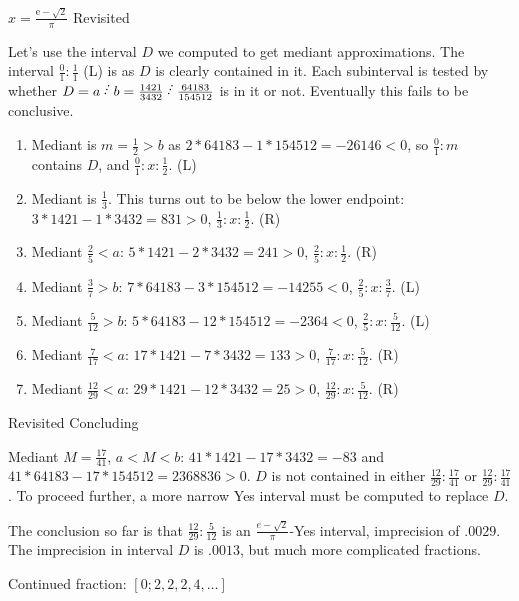 \documentclass{beamer}
\begin{document}
\begin{frame}{$x = \frac{\mathrm{e} -\sqrt{2}}{\pi}$ Revisited}

Let's use the interval $D$ we computed to get mediant approximations. The interval $\frac{0}{1}:\frac{1}{1}$ (L) is as $D$ is clearly contained in it. Each subinterval is tested by whether $D= a\lte b =  \frac{1421}{3432} \lte \frac{64183}{154512}$ is in it or not. Eventually this fails to be conclusive. 

\begin{enumerate}
\item Mediant is $m = \frac{1}{2} > b$ as $2*64183 - 1*154512 = -26146 < 0$,  so $\frac{0}{1}:m$ contains $D$, and $\frac{0}{1}: x :\frac{1}{2}$. (L)
\item Mediant is $\frac{1}{3}$. This turns out to be below the lower endpoint:  $3*1421 - 1*3432 = 831>0$,   $\frac{1}{3}: x : \frac{1}{2}$. (R)
\item Mediant $\frac{2}{5} < a$: $5*1421 - 2*3432 = 241 > 0$, $\frac{2}{5}: x:\frac{1}{2}$. (R)
\item Mediant $\frac{3}{7} > b$: $7*64183- 3*154512 = -14255 < 0$, $\frac{2}{5}: x :\frac{3}{7}$. (L)
\item Mediant  $\frac{5}{12} > b$: $5*64183 - 12*154512 = -2364 < 0$, $\frac{2}{5}: x : \frac{5}{12}$. (L)
\item Mediant $\frac{7}{17}< a$: $17*1421 - 7*3432 = 133 > 0$, $\frac{7}{17}: x : \frac{5}{12}$. (R)
\item Mediant $\frac{12}{29}<a$: $29*1421 - 12*3432 = 25 > 0$, $\frac{12}{29}: x : \frac{5}{12}$. (R)

\end{enumerate}

\end{frame}

\begin{frame}{Revisited Concluding}
    
Mediant $M = \frac{17}{41}$, $a < M < b$: $41*1421-17*3432 = -83$ and $41*64183-17*154512 = 2368836 >0$. $D$ is not contained in either $\frac{12}{29}: \frac{17}{41}$ or $\frac{12}{29}:\frac{17}{41}$. To proceed further, a more narrow Yes interval must be computed to replace $D$. 

The conclusion so far is that $\frac{12}{29}: \frac{5}{12}$ is an $\frac{e-\sqrt{2}}{\pi}$-Yes interval,  imprecision of $.0029$.  The imprecision in interval $D$ is $.0013$, but much more complicated fractions. 

Continued fraction:  $[0; 2, 2, 2, 4,\ldots]$
    
\end{frame}
\end{document}
